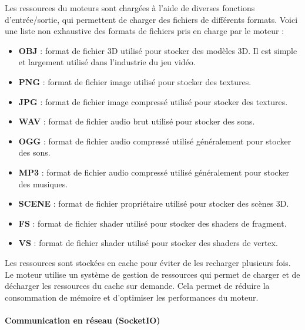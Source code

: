     Les ressources du moteurs sont chargées à l'aide de diverses
    fonctions d'entrée/sortie, qui permettent de charger des fichiers
    de différents formats. Voici une liste non exhaustive des formats
    de fichiers pris en charge par le moteur :\\
    \begin{itemize}
        \item \textbf{OBJ} : format de fichier 3D utilisé pour stocker
        des modèles 3D. Il est simple et largement utilisé dans
        l'industrie du jeu vidéo. \cite{obj_format}
        \item \textbf{PNG} : format de fichier image utilisé pour stocker
        des textures.
        \item \textbf{JPG} : format de fichier image compressé utilisé pour stocker
        des textures.
        \item \textbf{WAV} : format de fichier audio brut utilisé pour stocker
        des sons.
        \item \textbf{OGG} : format de fichier audio compressé utilisé généralement pour
        stocker des sons.
        \item \textbf{MP3} : format de fichier audio compressé utilisé généralement pour
        stocker des musiques.
        \item \textbf{SCENE} : format de fichier propriétaire utilisé pour
        stocker des scènes 3D.
        \item \textbf{FS} : format de fichier shader utilisé pour stocker
        des shaders de fragment. \cite{glsl}
        \item \textbf{VS} : format de fichier shader utilisé pour stocker
        des shaders de vertex. \cite{glsl}\\
    \end{itemize}
    
    Les ressources sont stockées en cache pour éviter de les recharger
    plusieurs fois. Le moteur utilise un système de gestion de
    ressources qui permet de charger et de décharger les ressources
    du cache sur demande. Cela permet de réduire la consommation de mémoire et
    d'optimiser les performances du moteur.
\paragraph{Communication en réseau (SocketIO)}

